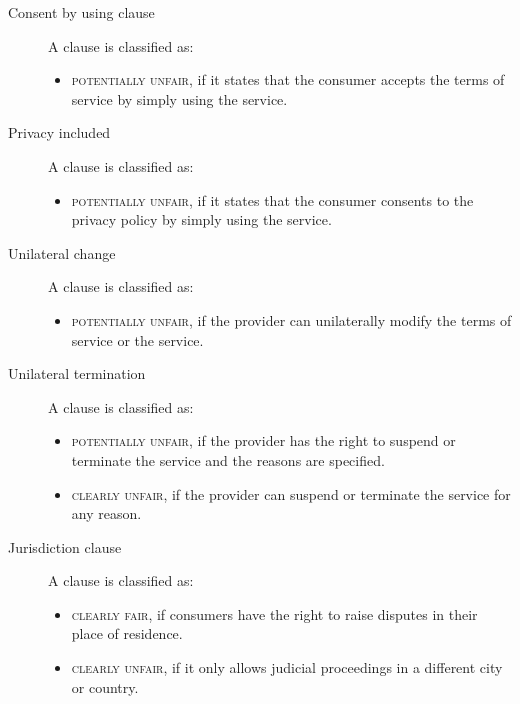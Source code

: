 \begin{description}
    \item[Consent by using clause] 
        A clause is classified as:
        \begin{itemize}
            \item \textsc{potentially unfair}, if it states that the consumer accepts the terms of service by simply using the service.
        \end{itemize}
         
    \item[Privacy included] 
        A clause is classified as:
        \begin{itemize}
            \item \textsc{potentially unfair}, if it states that the consumer consents to the privacy policy by simply using the service.
        \end{itemize}

    \item[Unilateral change] 
        A clause is classified as:
        \begin{itemize}
            \item \textsc{potentially unfair}, if the provider can unilaterally modify the terms of service or the service.
        \end{itemize}
    
    \item[Unilateral termination] 
        A clause is classified as:
        \begin{itemize}
            \item \textsc{potentially unfair}, if the provider has the right to suspend or terminate the service and the reasons are specified.
            \item \textsc{clearly unfair}, if the provider can suspend or terminate the service for any reason.
        \end{itemize}

    \item[Jurisdiction clause] 
        A clause is classified as:
        \begin{itemize}
            \item \textsc{clearly fair}, if consumers have the right to raise disputes in their place of residence.
            \item \textsc{clearly unfair}, if it only allows judicial proceedings in a different city or country.
        \end{itemize}


\end{description}
